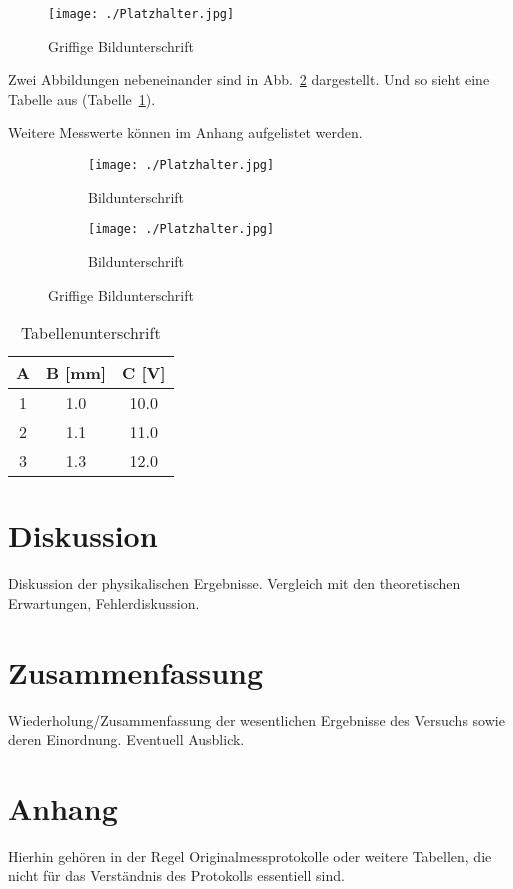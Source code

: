 \documentclass[12pt]{article}
\begin{document}
\begin{figure}[h!]
  \centering
  \texttt{[image: ./Platzhalter.jpg]}
  \caption{Griffige Bildunterschrift}
  \label{meinlabel1}
\end{figure}

Zwei Abbildungen nebeneinander sind in Abb.~\ref{meinlabel2} dargestellt.
Und so sieht eine Tabelle aus (Tabelle~\ref{tabdummy}).

Weitere Messwerte k\"onnen im Anhang \label{anhang} aufgelistet werden.


\begin{figure}[h!]
  \centering
  \begin{subfigure}{0.49\textwidth}
    \texttt{[image: ./Platzhalter.jpg]}
    \caption{Bildunterschrift}
  \end{subfigure}
  \hfill
  \begin{subfigure}{0.49\textwidth}
    \texttt{[image: ./Platzhalter.jpg]}
    \caption{Bildunterschrift}
  \end{subfigure}
  \caption{Griffige Bildunterschrift}
  \label{meinlabel2}
\end{figure}



\begin{table}[h]
  \begin{center}
    \begin{tabular}{|c|c|c|}
      \hline
      A & B [mm] & C [V] \\
      \hline
      1 & 1.0 & 10.0 \\
      2 & 1.1 & 11.0 \\
      3 & 1.3 & 12.0 \\
      \hline
    \end{tabular}
    \caption{Tabellenunterschrift}
    \label{tabdummy}
  \end{center}
\end{table}%


\section{Diskussion}
Diskussion der physikalischen Ergebnisse.
Vergleich mit den theoretischen Erwartungen, Fehlerdiskussion.


\section{Zusammenfassung}
Wiederholung/Zusammenfassung der wesentlichen Ergebnisse des Versuchs sowie deren Einordnung. Eventuell Ausblick.


\thispagestyle{empty}



\clearpage
\appendix
\section{Anhang} \label{anhang}
Hierhin geh\"oren in der Regel Originalmessprotokolle oder weitere Tabellen, die nicht f\"ur das Verst\"andnis des Protokolls essentiell sind.
\end{document}
